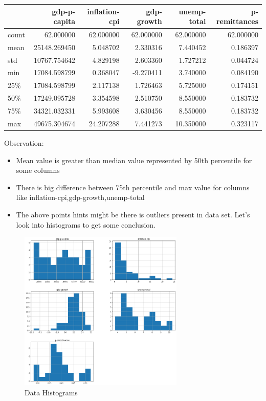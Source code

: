 \vspace{10mm}

\begin{tabular}{lrrrrr}
\toprule
{} &  gdp-p-capita &  inflation-cpi &  gdp-growth &  unemp-total &  p-remittances \\
\midrule
count &     62.000000 &      62.000000 &   62.000000 &    62.000000 &      62.000000 \\
mean  &  25148.269450 &       5.048702 &    2.330316 &     7.440452 &       0.186397 \\
std   &  10767.754642 &       4.829198 &    2.603360 &     1.727212 &       0.044724 \\
min   &  17084.598799 &       0.368047 &   -9.270411 &     3.740000 &       0.084190 \\
25\%   &  17084.598799 &       2.117138 &    1.726463 &     5.725000 &       0.174151 \\
50\%   &  17249.095728 &       3.354598 &    2.510750 &     8.550000 &       0.183732 \\
75\%   &  34321.032331 &       5.993608 &    3.630456 &     8.550000 &       0.183732 \\
max   &  49675.304674 &      24.207288 &    7.441273 &    10.350000 &       0.323117 \\
\bottomrule
\end{tabular}
\vspace{10mm}


Observation:
\begin{itemize}
    \item Mean value is greater than median value represented by 50th percentile for some columns
\item There is big difference between 75th percentile and max value for columns like inflation-cpi,gdp-growth,unemp-total
\item The above points hints might be there is outliers present in data set. Let's look into histograms to get some conclusion.
\end{itemize}


\begin{figure}[H]
    \centering
    \includegraphics[width=0.7\textwidth]{Images/histograms.png}
    \caption{Data Histograms}
    \label{fig1}
\end{figure}

